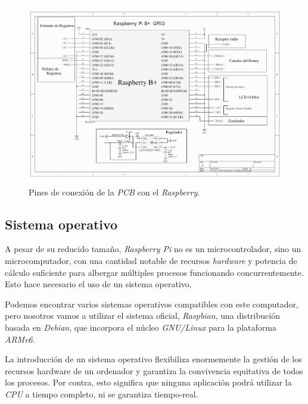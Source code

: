\begin{figure}[H]
	\noindent \begin{centering}
		\includegraphics[width=\linewidth*3/4]{capitulo3/pcb_schem}
		\par\end{centering}
	\smallskip
	\caption{\label{fig:pcb_schem} Pines de conexión de la \textit{PCB} con el \textit{Raspberry}.}
\end{figure} 

\smallskip

\subsection{Sistema operativo}

A pesar de su reducido tamaño, \textit{Raspberry Pi} no es un microcontrolador, sino un microcomputador, con una cantidad notable de recursos \textit{hardware} y potencia de cálculo suficiente para albergar múltiples procesos funcionando concurrentemente. Esto hace necesario el uso de un sistema operativo.

Podemos encontrar varios sistemas operativos compatibles con este computador, pero nosotros vamos a utilizar el sistema oficial, \textit{Raspbian}, una distribución basada en \textit{Debian}, que incorpora el núcleo \textit{GNU/Linux} para la plataforma \textit{ARMv6}.

La introducción de un sistema operativo flexibiliza enormemente la gestión de los recursos hardware de un ordenador y garantiza la convivencia equitativa de todos los procesos. Por contra, esto significa que ninguna aplicación podrá utilizar la \textit{CPU} a tiempo completo, ni se garantiza tiempo-real.

